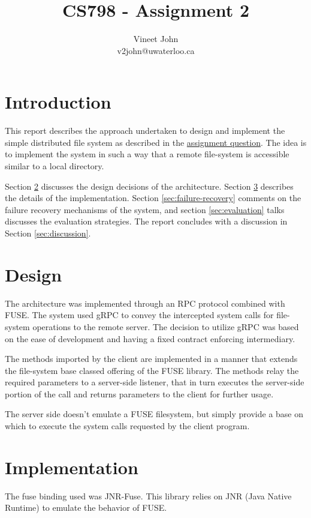 \documentclass[a4paper]{article}
\title{CS798 - Assignment 2}
\author{Vineet John\\v2john@uwaterloo.ca}
\begin{document}
\maketitle

\section{Introduction}
This report describes the approach undertaken to design and implement the simple distributed file system as described in the \href{https://cs.uwaterloo.ca/~alkiswan/Classes/CS798/internal/a2.html}{assignment question}. The idea is to implement the system in such a way that a remote file-system is accessible similar to a local directory.

Section \ref{sec:design} discusses the design decisions of the architecture. Section \ref{sec:implementation} describes the details of the implementation. Section \ref{sec:failure-recovery} comments on the failure recovery mechanisms of the system, and section \ref{sec:evaluation} talks discusses the evaluation strategies. The report concludes with a discussion in Section \ref{sec:discussion}.

\section{Design} \label{sec:design}
The architecture was implemented through an RPC protocol combined with FUSE\cite{libfusel7:online}. The system used gRPC\cite{grpcgrpc62:online} to convey the intercepted system calls for file-system operations to the remote server. The decision to utilize gRPC was based on the ease of development and having a fixed contract enforcing intermediary.

The methods imported by the client are implemented in a manner that extends the file-system base classed offering of the FUSE library. The methods  relay the required parameters to a server-side listener, that in turn executes the server-side portion of the call and returns parameters to the client for further usage.

The server side doesn't emulate a FUSE filesystem, but simply provide a base on which to execute the system calls requested by the client program.

\section{Implementation} \label{sec:implementation}
The fuse binding used was JNR-Fuse\cite{SerCeMan78:online}. This library relies on JNR (Java Native Runtime) to emulate the behavior of FUSE. 
\end{document}
